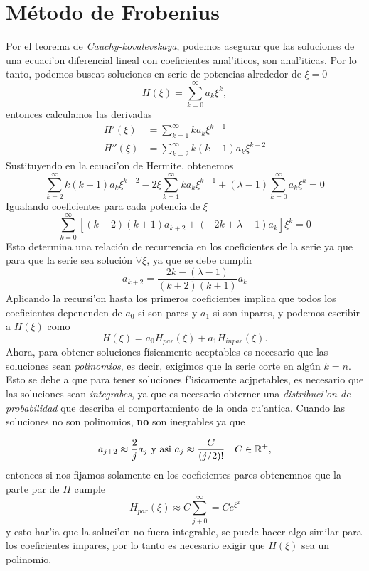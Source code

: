 \documentclass[main.tex]{subfiles}
\begin{document}
\section*{Método de Frobenius}
\noindent Por el teorema de \emph{Cauchy-kovalevskaya}, podemos asegurar que las soluciones de una ecuaci'on diferencial lineal con coeficientes anal'iticos, son anal'iticas. Por lo tanto, podemos buscat soluciones en serie de potencias alrededor de \(\xi = 0\)
\begin{equation}
H(\xi) = \sum_{k=0}^\infty a_k \xi^k,
\end{equation}
entonces calculamos las derivadas
\begin{align*}
H'(\xi) &= \sum_{k=1}^\infty k a_k \xi^{k-1} \\
H''(\xi) &= \sum_{k=2}^\infty k(k-1) a_k \xi^{k-2}
\end{align*}
Sustituyendo en la ecuaci'on de Hermite, obtenemos
\begin{equation}
\sum_{k=2}^\infty k(k-1)a_k\xi^{k-2}-2\xi\sum_{k=1}^\infty k a_k \xi^{k-1} + (\lambda - 1) \sum_{k=0}^\infty a_k \xi^k = 0
\end{equation}
Igualando coeficientes para cada potencia de \(\xi\)
\[
\sum_{k=0}^\infty \left[(k+2)(k+1)a_{k+2} + (-2k + \lambda - 1)a_k\right] \xi^k = 0
\]
Esto determina una relación de recurrencia en los coeficientes de la serie ya que para que la serie sea solución \(\forall \xi\), ya que se debe cumplir
\begin{equation}
a_{k+2} = \frac{2k - (\lambda - 1)}{(k+2)(k+1)} a_k
\end{equation}
Aplicando la recursi'on hasta los primeros coeficientes implica que todos los coeficientes depenenden de $a_{0}$ si son pares y $a_{1}$ si son inpares, y podemos escribir a $H(\xi)$ como
\[
  H(\xi)=a_{0}H_{par}(\xi)+a_{1}H_{inpar}(\xi).
\]
Ahora, para obtener soluciones físicamente aceptables es necesario que las soluciones sean \emph{polinomios}, es decir, exigimos que la serie corte en algún \(k = n\). Esto se debe a que para tener soluciones f'isicamente acjpetables, es necesario que las soluciones sean \emph{integrabes}, ya que es necesario obterner una  \emph{distribuci'on de probabilidad} que describa el comportamiento de la onda cu'antica. Cuando las soluciones no son polinomios, \textbf{no} son inegrables ya que 

\[
  a_{j+2}\approx\frac{2}{j}a_{j}\text{ y asi } a_{j}\approx \frac{C}{(j/2)!}\quad C\in\mathbb R ^{+},
\]
entonces si nos fijamos solamente en los coeficientes pares obtenemnos que la parte par de $H$ cumple
\[
  H_{par}(\xi)\approx C\sum_{j+0}^{\infty}=Ce^{\xi^{2}}
\]
y esto har'ia que la soluci'on no fuera integrable, se puede hacer algo similar para los coeficientes impares, por lo tanto es necesario exigir que $H(\xi)$ sea un polinomio.
\end{document}
